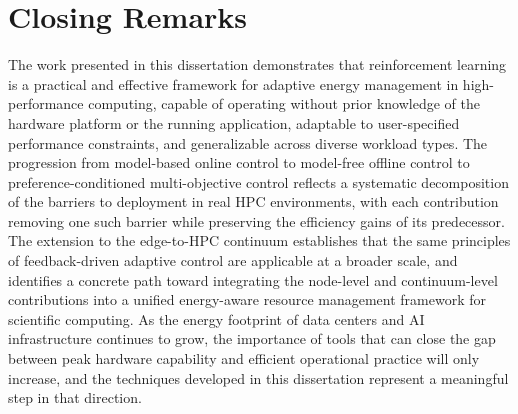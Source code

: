 \section{Closing Remarks}

The work presented in this dissertation demonstrates that reinforcement learning is a
practical and effective framework for adaptive energy management in high-performance
computing, capable of operating without prior knowledge of the hardware platform or
the running application, adaptable to user-specified performance constraints, and
generalizable across diverse workload types.
The progression from model-based online control to model-free offline control to
preference-conditioned multi-objective control reflects a systematic decomposition of
the barriers to deployment in real HPC environments, with each contribution removing
one such barrier while preserving the efficiency gains of its predecessor.
The extension to the edge-to-HPC continuum establishes that the same principles of
feedback-driven adaptive control are applicable at a broader scale, and identifies a
concrete path toward integrating the node-level and continuum-level contributions into
a unified energy-aware resource management framework for scientific computing.
As the energy footprint of data centers and AI infrastructure continues to grow, the
importance of tools that can close the gap between peak hardware capability and
efficient operational practice will only increase, and the techniques developed in this
dissertation represent a meaningful step in that direction.
